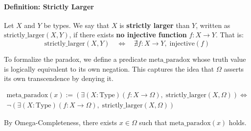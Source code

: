 \documentclass[12pt]{article}
\begin{document}
\paragraph{Definition: Strictly Larger}
Let \( X \) and \( Y \) be types. We say that \( X \) is \textbf{strictly larger} than \( Y \), written as \( \text{strictly\_larger}(X, Y) \), if there exists \textbf{no injective function} \( f: X \to Y \). That is:
\[
\text{strictly\_larger}(X, Y) \quad \Longleftrightarrow \quad \nexists f: X \to Y, \; \text{injective}(f)
\]

To formalize the paradox, we define a predicate $\text{meta\_paradox}$ whose truth value is logically equivalent to its own negation. This captures the idea that \( \Omega \) asserts its own transcendence by denying it.

\begin{align}
\text{meta\_paradox}(x) := 
\left(
\exists (X : \text{Type}) (f : X \to \Omega),\; \text{strictly\_larger}(X, \Omega)
\right)
\iff \\
\neg
\left(
\exists (X : \text{Type}) (f : X \to \Omega),\; \text{strictly\_larger}(X, \Omega)
\right)
\end{align}

By Omega-Completeness, there exists \( x \in \Omega \) such that \( \text{meta\_paradox}(x) \) holds.
\end{document}
